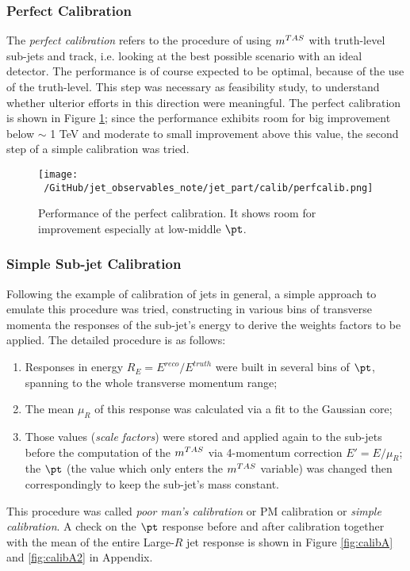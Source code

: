 \subsubsection{Perfect Calibration}
The \textit{perfect calibration} refers to the procedure of using $m^{TAS}$ with truth-level sub-jets and track, i.e. looking at the best possible scenario with an ideal detector. The performance is of course expected to be optimal, because of the use of the truth-level. This step was necessary as feasibility study, to understand whether ulterior efforts in this direction were meaningful.
The perfect calibration is shown in Figure \ref{fig:perfcalib}; since the performance exhibits room for big improvement below $\sim$ 1 TeV and moderate to small improvement above this value, the second step of a simple calibration was tried.

\begin{figure}[!ht]
  \centering
      \texttt{[image: ~/GitHub/jet\_observables\_note/jet\_part/calib/perfcalib.png]}
  \caption[Perfect calibration]{Performance of the perfect calibration. It shows room for improvement especially at low-middle $\pt$.}
  \label{fig:perfcalib}
\end{figure}


\subsubsection{Simple Sub-jet Calibration}
Following the example of calibration of jets in general, a simple approach to emulate this procedure was tried, constructing in various bins of transverse momenta the responses of the sub-jet's energy to derive the weights factors to be applied. The detailed procedure is as follows:
\begin{enumerate}
 \item Responses in energy $R_E=E^{reco}/E^{truth}$ were built in several bins of $\pt$, spanning to the whole transverse momentum range;
 \item The mean $\mu_R$ of this response was calculated via a fit to the Gaussian core;
 \item Those values (\textit{scale factors}) were stored and applied again to the sub-jets before the computation of the $m^{TAS}$ via 4-momentum correction $E'=E/\mu_R$; the $\pt$ (the value which only enters the $m^{TAS}$ variable) was changed then correspondingly to keep the sub-jet's mass constant.
\end{enumerate}

This procedure was called \textit{poor man's calibration} or PM calibration or \textit{simple calibration}.
A check on the $\pt$ response before and after calibration together with the mean of the entire Large-$R$ jet response is shown in Figure \ref{fig:calibA} and \ref{fig:calibA2} in Appendix.

